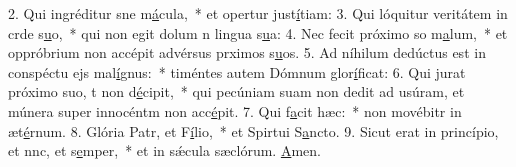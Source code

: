 2. Qui ingréditur sne m\uline{á}cula,~* et opertur just\uline{í}tiam:
3. Qui lóquitur veritátem in crde s\uline{u}o,~* qui non egit dolum n lingua s\uline{u}a:
4. Nec fecit próximo so m\uline{a}lum,~* et oppróbrium non accépit advérsus prximos s\uline{u}os.
5. Ad níhilum dedúctus est in conspéctu ejs mal\uline{í}gnus:~* timéntes autem Dómnum glor\uline{í}ficat:
6. Qui jurat próximo suo, t non d\uline{é}cipit,~* qui pecúniam suam non dedit ad usúram, et múnera super innocéntm non acc\uline{é}pit.
7. Qui f\uline{a}cit hæc:~* non movébitr in æt\uline{é}rnum.
8. Glória Patr, et F\uline{í}lio,~* et Spirtui S\uline{a}ncto.
9. Sicut erat in princípio, et nnc, et s\uline{e}mper,~* et in sǽcula sæclórum. \uline{A}men.
